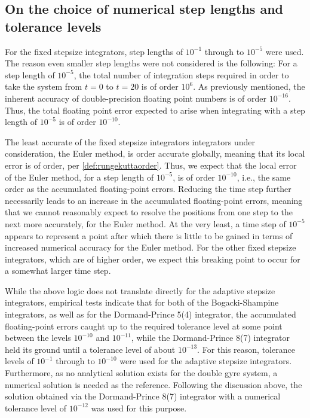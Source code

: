 \subsection{On the choice of numerical step lengths and tolerance levels}
\label{sub:on_the_choice_of_numerical_step_lengths_and_tolerance_levels}

For the fixed stepsize integrators, step lengths of $10^{-1}$ through to
$10^{-5}$ were used. The reason even smaller step lengths were not considered
is the following: For a step length of $10^{-5}$, the total number of
integration steps required in order to take the system from $t=0$ to $t=20$
is of order $10^{6}$. As previously mentioned, the inherent accuracy of
double-precision floating point numbers is of order $10^{-16}$. Thus, the
total floating point error expected to arise when integrating with a step
length of $10^{-5}$ is of order $10^{-10}$.

The least accurate of the fixed stepsize integrators integrators under
consideration, the Euler method, is  order accurate globally, meaning
that its local error is of  order, per
\cref{def:rungekuttaorder}. Thus, we expect that the local error of the Euler
method, for a step length of $10^{-5}$, is of order $10^{-10}$, i.e., the
same order as the accumulated floating-point errors. Reducing the time step
further necessarily leads to an increase in the accumulated floating-point
errors, meaning that we cannot reasonably expect to resolve the positions
from one step to the next more accurately, for the Euler method. At the very
least, a time step of $10^{-5}$ appears to represent a point after which
there is little to be gained in terms of increased numerical accuracy for the
Euler method. For the other fixed stepsize integrators, which are of higher
order, we expect this breaking point to occur for a somewhat larger time step.

While the above logic does not translate directly for the adaptive stepsize
integrators, empirical tests indicate that for both of the Bogacki-Shampine
integrators, as well as for the Dormand-Prince 5(4) integrator, the accumulated
floating-point errors caught up to the required tolerance level at some point
between the levels $10^{-10}$ and $10^{-11}$, while the Dormand-Prince 8(7)
integrator held its ground until a tolerance level of about $10^{-13}$. For this
reason, tolerance levels of $10^{-1}$ through to $10^{-10}$ were used for the
adaptive stepsize integrators. Furthermore, as no analytical solution exists
for the double gyre system, a numerical solution is needed as the reference.
Following the discussion above, the solution obtained via the Dormand-Prince
8(7) integrator with a numerical tolerance level of $10^{-12}$ was used for
this purpose.

